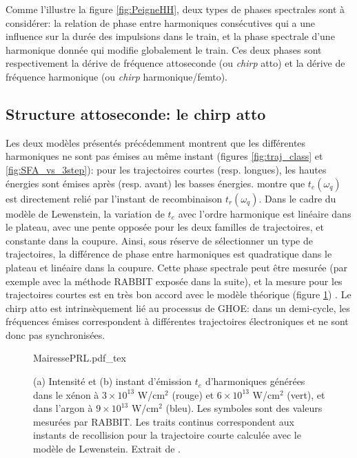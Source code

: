 Comme l'illustre la figure \ref{fig:PeigneHH}, deux types de phases spectrales sont à considérer: la relation de phase entre harmoniques consécutives qui a une influence sur la durée des impulsions dans le train, et la phase spectrale d'une harmonique donnée qui modifie globalement le train. Ces deux phases sont respectivement la dérive de fréquence attoseconde (ou \textit{chirp} atto) et la dérive de fréquence harmonique (ou \textit{chirp} harmonique/femto).

\subsection{Structure attoseconde: le chirp atto} 
\label{subsec:ChirpAtto}
Les deux modèles présentés précédemment montrent que les différentes harmoniques ne sont pas émises au même instant (figures \ref{fig:traj_class} et \ref{fig:SFA_vs_3step}): pour les trajectoires courtes (resp. longues), les hautes énergies sont émises après (resp. avant) les basses énergies.  montre que $t_e(\omega_q)$ est directement relié par l'instant de recombinaison $t_r(\omega_q)$. Dans le cadre du modèle de Lewenstein, la variation de $t_e$ avec l'ordre harmonique est linéaire dans le plateau, avec une pente opposée pour les deux familles de trajectoires, et constante dans la coupure. Ainsi, sous réserve de sélectionner un type de trajectoires, la différence de phase entre harmoniques est quadratique dans le plateau et linéaire dans la coupure. Cette phase spectrale peut être mesurée (par exemple avec la méthode RABBIT exposée dans la suite), et la mesure pour les trajectoires courtes est en très bon accord avec le modèle théorique (figure \ref{fig:MairessePRL}) . Le chirp atto est intrinsèquement lié au processus de GHOE: dans un demi-cycle, les fréquences émises correspondent à différentes trajectoires électroniques et ne sont donc pas synchronisées.  

\begin{figure}
\centering
\def\svgwidth{0.7\columnwidth}
{MairessePRL.pdf_tex}
\caption{(a) Intensité et (b) instant d'émission $t_e$ d'harmoniques générées dans le xénon à $3 \times 10^{13}$ W/cm$^2$ (rouge) et $6 \times 10^{13}$ W/cm$^2$ (vert), et dans l'argon à $9 \times 10^{13}$ W/cm$^2$ (bleu). Les symboles sont des valeurs mesurées par RABBIT. Les traits continus correspondent aux instants de recollision pour la trajectoire courte calculée avec le modèle de Lewenstein. Extrait de .}
\label{fig:MairessePRL}
\end{figure}

